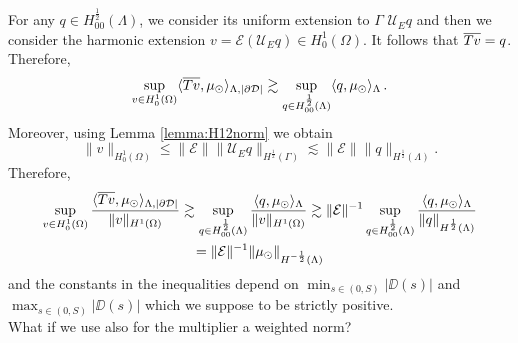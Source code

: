 For any $q \in H^{\frac 12}_{00}(\Lambda)$, we consider its uniform extension to $\Gamma$ $\mathcal{U}_E q$
and then we consider the harmonic extension $v=\mathcal{E}(\mathcal{U}_E q)\in H^1_0(\Omega)$. It follows that $\overline{T v}=q$. Therefore, 
\begin{equation*}
\sup _{v\in H^1_0(\Omega)}  \langle \overline{T v}, \mu_{\odot} \rangle_{\Lambda,|\partial\mathcal{D}|} \gtrsim \sup_{q \in H^{\frac 12}_{00}(\Lambda)} \langle q, \mu_{\odot}  \rangle_\Lambda\,.
\end{equation*}
Moreover, using Lemma \ref{lemma:H12norm} we obtain
\begin{equation*}
\|v\|_{H^1_0(\Omega)}\leq \|\mathcal{E}\| \|\mathcal{U}_E q\|_{H^{\frac 12}(\Gamma)}  \lesssim \|\mathcal{E}\| \|q\|_{H^{\frac 12}(\Lambda)}.
\end{equation*}
 Therefore,
\begin{multline*}
\sup _{v\in H^1_0(\Omega)} \frac{ \langle \overline{T v}, \mu_{\odot} \rangle_{\Lambda,|\partial\mathcal{D}|}}{\|v\|_{H^1(\Omega)}}
\gtrsim \sup _{q\in H^{\frac 12}_{00}(\Lambda)} \frac{ \langle q, \mu_{\odot} \rangle_\Lambda}{\|v\|_{H^1(\Omega)}}
\gtrsim \|\mathcal{E}\|^{-1} \sup _{q\in H^{\frac 12}_{00}(\Lambda)} \frac{ \langle q, \mu_{\odot} \rangle_\Lambda}{\|q\|_{H^{\frac 12}(\Lambda)}} 
\\= \|\mathcal{E}\|^{-1} \|\mu_{\odot}\|_{H^{-\frac 12}(\Lambda)}
\end{multline*}
and the constants in the inequalities depend on $\min _{s \in (0,S)} |\DD(s)|$ and $\max _{s \in (0,S)} |\DD(s)|$ which we suppose to be strictly positive.\\
{\color{red} What if we use also for the multiplier a weighted norm?}


